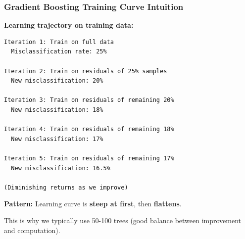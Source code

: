 \documentclass{beamer}
\begin{document}
\begin{frame}[fragile]
\frametitle{Gradient Boosting Training Curve Intuition}

\textbf{Learning trajectory on training data:}

\vspace{0.2cm}
{\small
\begin{lstlisting}
Iteration 1: Train on full data
  Misclassification rate: 25%

Iteration 2: Train on residuals of 25% samples
  New misclassification: 20%

Iteration 3: Train on residuals of remaining 20%
  New misclassification: 18%

Iteration 4: Train on residuals of remaining 18%
  New misclassification: 17%

Iteration 5: Train on residuals of remaining 17%
  New misclassification: 16.5%

(Diminishing returns as we improve)
\end{lstlisting}
}

\vspace{0.2cm}
\textbf{Pattern:} Learning curve is \textbf{steep at first}, then \textbf{flattens}.

\vspace{0.2cm}
This is why we typically use 50-100 trees (good balance between improvement and computation).

\end{frame}
\end{document}
